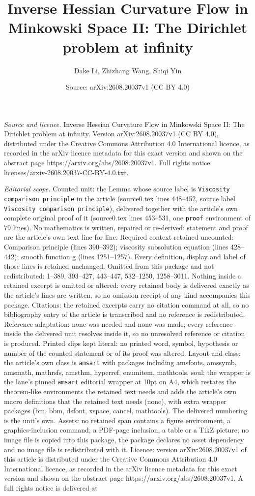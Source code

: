 \documentclass[10pt,a4paper]{amsart}
\title[Inverse Hessian Curvature Flow in Minkowski Space II: The Di]{Inverse Hessian Curvature Flow in Minkowski Space II: The Dirichlet problem at infinity}
\author{Dake Li, Zhizhang Wang, Shiqi Yin}
\date{Source: arXiv:2608.20037v1 (CC BY 4.0)}
\begin{document}
\maketitle

\noindent\emph{Source and licence.} Inverse Hessian Curvature Flow in Minkowski Space II: The Dirichlet problem at infinity. Version arXiv:2608.20037v1 (CC BY 4.0), distributed under the Creative Commons Attribution 4.0 International licence, as recorded in the arXiv licence metadata for this exact version and shown on the abstract page https://arxiv.org/abs/2608.20037v1. Full rights notice: licenses/arxiv-2608.20037-CC-BY-4.0.txt.\par\smallskip

\noindent\textit{Editorial scope.} Counted unit: the Lemma whose source label is \texttt{Viscosity comparison principle} in the article (source0.tex lines 448--452, source label \texttt{Viscosity comparison principle}), delivered together with the article's own complete original proof of it (source0.tex lines 453--531, one \texttt{proof} environment of 79 lines). No mathematics is written, repaired or re-derived: statement and proof are the article's own text line for line. Required context retained uncounted: Comparison principle (lines 390--392); viscosity subsolution equation (lines 428--442); smooth function g (lines 1251--1257). Every definition, display and label of those lines is retained unchanged. Omitted from this package and not redistributed: 1--389, 393--427, 443--447, 532--1250, 1258--3011. Nothing inside a retained excerpt is omitted or altered: every retained body is delivered exactly as the article's lines are written, so no omission receipt of any kind accompanies this package. Citations: the retained excerpts carry no citation command at all, so no bibliography entry of the article is transcribed and no reference is redistributed. Reference adaptation: none was needed and none was made; every reference inside the delivered unit resolves inside it, so no unresolved reference or citation is produced. Printed slips kept literal: no printed word, symbol, hypothesis or number of the counted statement or of its proof was altered. Layout and class: the article's own class is \texttt{amsart} with packages including amsfonts, amssymb, amsmath, mathrsfs, amsthm, hyperref, enumitem, mathtools, soul; the wrapper is the lane's pinned \texttt{amsart} editorial wrapper at 10pt on A4, which restates the theorem-like environments the retained text needs and adds the article's own macro definitions that the retained text needs (none), with extra wrapper packages (bm, bbm, dsfont, xspace, cancel, mathtools). The delivered numbering is the unit's own. Assets: no retained span contains a figure environment, a graphics-inclusion command, a PDF-page inclusion, a table or a TikZ picture; no image file is copied into this package, the package declares no asset dependency and no image file is redistributed with it. Licence: version arXiv:2608.20037v1 of this article is distributed under the Creative Commons Attribution 4.0 International licence, as recorded in the arXiv licence metadata for this exact version and shown on the abstract page https://arxiv.org/abs/2608.20037v1. A full rights notice is delivered at 
\end{document}
